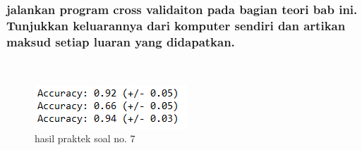 \subsubsection{jalankan program cross validaiton pada bagian teori bab ini. Tunjukkan keluarannya dari komputer sendiri dan artikan maksud setiap luaran yang didapatkan.}
\hfill\\

	\begin{figure}[H]
	\centering
		\includegraphics[width=5 cm]{figures/1174067/4/16.png}
	\caption{hasil praktek soal no. 7}
	\end{figure}

